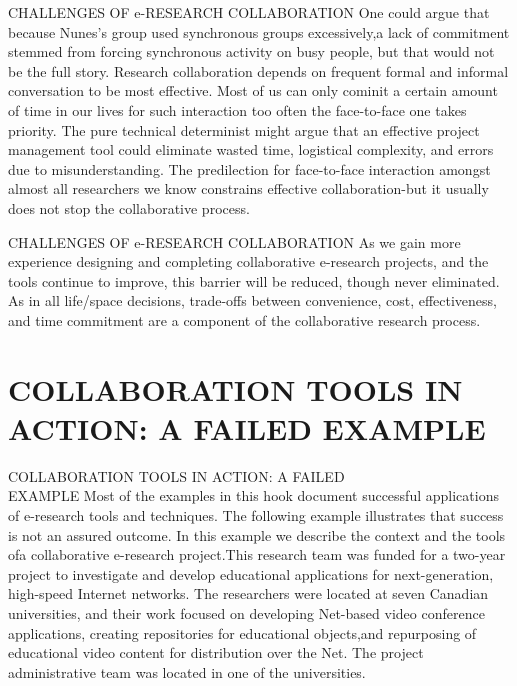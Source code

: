 \documentclass{beamer}
\begin{document}

\begin{frame}[t]{CHALLENGES OF e-RESEARCH COLLABORATION}
	One could argue that because Nunes's group used synchronous groups excessively,a lack of commitment stemmed from forcing synchronous activity on busy people, but that would not be the full story. Research collaboration depends on frequent formal and informal conversation to be most effective. Most of us can only cominit a certain amount
	of time in our lives for such interaction too often the face-to-face one takes priority.
	The pure technical determinist might argue that an effective project management tool
	could eliminate wasted time, logistical complexity, and errors due to misunderstanding.
	The predilection for face-to-face interaction amongst almost all researchers we know
	constrains effective collaboration-but it usually does not stop the collaborative process. 
\end{frame}


\begin{frame}[t]{CHALLENGES OF e-RESEARCH COLLABORATION}
As we gain more experience designing and completing collaborative e-research projects,
and the tools continue to improve, this barrier will be reduced, though never eliminated.
As in all life/space decisions, trade-offs between convenience, cost, effectiveness, and
time commitment are a component of the collaborative research process.
\end{frame}


\section{COLLABORATION TOOLS IN ACTION: A FAILED EXAMPLE}


\begin{frame}[t]{COLLABORATION TOOLS IN ACTION: A FAILED\\ EXAMPLE}
	Most of the examples in this hook document successful applications of e-research tools
	and techniques. The following example illustrates that success is not an assured outcome.
	In this example we describe the context and the tools ofa collaborative e-research project.This research team was funded for a two-year project to investigate and develop
	educational applications for next-generation, high-speed Internet networks. The
	researchers were located at seven Canadian universities, and their work focused on developing Net-based video conference applications, creating repositories for educational
	objects,and repurposing of educational video content for distribution over the Net. The
	project administrative team was located in one of the universities.
\end{frame}
\end{document}
